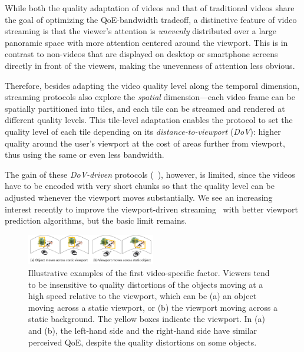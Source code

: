 While both the quality adaptation of \vr videos and that of traditional videos share the goal of optimizing the QoE-bandwidth tradeoff, a distinctive feature of \vr video streaming is that the viewer's attention is {\em unevenly} distributed over a large panoramic space with more attention centered around the viewport. 
This is in contrast to non-\vr videos that are displayed on desktop or smartphone screens directly in front of the viewers, making the unevenness of attention less obvious.

Therefore, besides adapting the video quality level along the temporal dimension, \vr streaming protocols also explore the {\em spatial} dimension---each video frame can be spatially partitioned into tiles, and each tile can be streamed and rendered at different quality levels.
This tile-level adaptation enables the protocol to set the quality level of each tile depending on its {\em distance-to-viewport} ({\em DoV}): higher quality around the user's viewport at the cost of areas further from viewport, thus using the same or even less bandwidth. 

The gain of these {\em DoV-driven} protocols (\eg~\cite{??,??,??}), however, is limited, since the videos have to be encoded with very short chunks so that the quality level can be adjusted whenever the viewport moves substantially. 
We see an increasing interest recently to improve the viewport-driven streaming~\cite{??,??,??} with better viewport prediction algorithms, but the basic limit remains.


\begin{figure}[t!]
  \centering
  \includegraphics[width=0.5\textwidth]{figures/example-velocity.pdf}
  \caption{Illustrative examples of the first \vr video-specific factor. 
  Viewers tend to be insensitive to quality distortions of the objects moving at a high speed relative to the viewport, which can be (a) an object moving across a static viewport, or (b) the viewport moving across a static background. The yellow boxes indicate the viewport. 
  In (a) and (b), the left-hand side and the right-hand side have similar perceived QoE, despite the quality distortions on some objects.}
  \label{fig:example-velocity}
  \end{figure}

